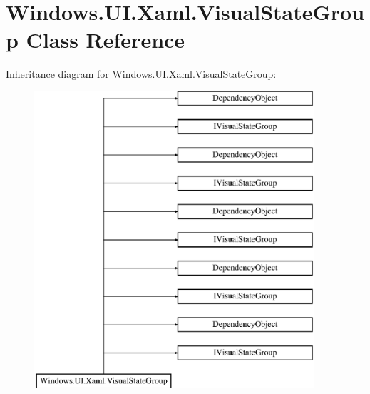 \hypertarget{class_windows_1_1_u_i_1_1_xaml_1_1_visual_state_group}{}\section{Windows.\+U\+I.\+Xaml.\+Visual\+State\+Group Class Reference}
\label{class_windows_1_1_u_i_1_1_xaml_1_1_visual_state_group}
Inheritance diagram for Windows.\+U\+I.\+Xaml.\+Visual\+State\+Group\+:\begin{figure}[H]
\begin{center}
\leavevmode
\includegraphics[height=11.000000cm]{class_windows_1_1_u_i_1_1_xaml_1_1_visual_state_group}
\end{center}
\end{figure}
